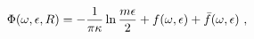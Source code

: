 \begin{equation}\label{2.25}
\Phi(\omega,\epsilon,R)=-{1 \over \pi \kappa} \ln {m \epsilon \over 2}
+f(\omega,\epsilon)+\bar{f}(\omega,\epsilon)~,
\end{equation}

